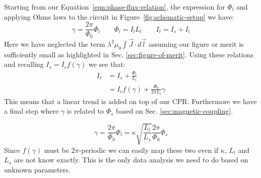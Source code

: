 Starting from our Equation~\ref{eqn:phase-flux-relation}, the expression for $\Phi_l$ and applying Ohms laws to the circuit in Figure~\ref{fig:schematic-setup} we have:
\begin{equation}
	\gamma = \frac{2\pi}{\Phi_0}\Phi_l \qquad \Phi_l = I_lL_l \qquad I_t = I_s + I_l
\end{equation}
Here we have neglected the term $\lambda^2\mu_0 \int \vec{J}\cdot d \vec{l}$ assuming our figure or merit is sufficiently small as highlighted in Sec. \ref{sec:figure-of-merit}. Using these relations and recalling $I_s = I_cf(\gamma)$ we see that:
\begin{align}
	I_t &= I_s + \frac{\Phi_l}{L_l} \nonumber \\
	    &= I_c f(\gamma) + \frac{\Phi_0}{2\pi L_l}\gamma
\end{align}
This means that a linear trend is added on top of our CPR. Furthermore we have a final step where $\gamma$ is related to $\Phi_s$ based on Sec. \ref{sec:magnetic-coupling}.

\begin{equation}
	\gamma = \frac{2\pi}{\Phi_0}\Phi_l = \kappa \sqrt{\frac{L_l}{L_s}} \frac{2\pi}{\Phi_0} \Phi_s
\end{equation}
Since $f(\gamma)$ must be $2\pi$-periodic we can easily map these two even if $\kappa$, $L_l$ and $L_s$ are not know exactly. This is the only data analysis we need to do based on unknown parameters.